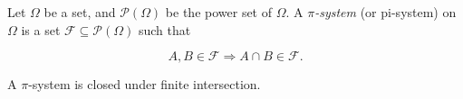 \documentclass[12pt]{article}
\newcommand{\powerset}[1]{\mathcal{P}(#1)}
\begin{document}
Let $\Omega$ be a set, and $\powerset{\Omega}$ be the power set of $\Omega$.  A \emph{$\pi$-system} (or pi-system) on $\Omega$ is a set $\mathcal{F} \subseteq \powerset{\Omega}$ such that

\begin{equation}
A,B \in \mathcal{F} \Rightarrow A \cap B \in \mathcal{F}.
\end{equation}

A $\pi$-system is closed under finite intersection.
\end{document}
